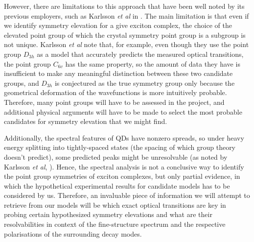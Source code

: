 \documentclass[12pt]{article}
\begin{document}
However, there are limitations to this approach that have been well noted by its previous employers, such as Karlsson \textit{et al} in \cite{karlsson}. The main limitation is that even if we identify symmetry elevation for a give exciton complex, the choice of the elevated point group of which the crystal symmetry point group is a subgroup is not unique. Karlsson \textit{et al} note that, for example, even though they use the point group $D_{3h}$ as a model that accurately predicts the measured optical transitions, the point group $C_{6v}$ has the same property, so the amount of data they have is insufficient to make any meaningful distinction between these two candidate groups, and $D_{3h}$ is conjectured as the true symmetry group only because the geometrical deformation of the wavefunctions is more intuitively probable. Therefore, many point groups will have to be assessed in the project, and additional physical arguments will have to be made to select the most probable candidates for symmetry elevation that we might find.

Additionally, the spectral features of QDs have nonzero spreads, so under heavy energy splitting into tightly-spaced states (the spacing of which group theory doesn't predict), some predicted peaks might be unresolvable (as noted by Karlsson \textit{et al}, \cite{karlsson}). Hence, the spectral analysis is not a conclusive way to identify the point group symmetries of exciton complexes, but only partial evidence, in which the hypothetical experimental results for candidate models has to be considered by us. Therefore, an invaluable piece of information we will attempt to retrieve from our models will be which exact optical transitions are key in probing certain hypothesized symmetry elevations and what are their resolvabilities in context of the fine-structure spectrum and the respective polarisations of the surrounding decay modes.
\end{document}
